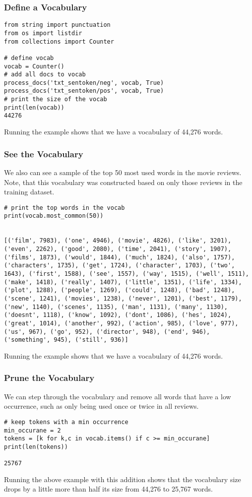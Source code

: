 \begin{frame}[fragile]\frametitle{Define a Vocabulary}
\begin{lstlisting}
from string import punctuation
from os import listdir
from collections import Counter

# define vocab
vocab = Counter()
# add all docs to vocab
process_docs('txt_sentoken/neg', vocab, True)
process_docs('txt_sentoken/pos', vocab, True)
# print the size of the vocab
print(len(vocab))
44276
\end{lstlisting}
Running the example shows that we have a vocabulary of 44,276 words.
\end{frame}

\begin{frame}[fragile]\frametitle{See the Vocabulary}
We also can see a sample of the top 50 most used words in the movie reviews.
Note, that this vocabulary was constructed based on only those reviews in the training dataset.

\begin{lstlisting}
# print the top words in the vocab
print(vocab.most_common(50))


[('film', 7983), ('one', 4946), ('movie', 4826), ('like', 3201), ('even', 2262), ('good', 2080), ('time', 2041), ('story', 1907), ('films', 1873), ('would', 1844), ('much', 1824), ('also', 1757), ('characters', 1735), ('get', 1724), ('character', 1703), ('two', 1643), ('first', 1588), ('see', 1557), ('way', 1515), ('well', 1511), ('make', 1418), ('really', 1407), ('little', 1351), ('life', 1334), ('plot', 1288), ('people', 1269), ('could', 1248), ('bad', 1248), ('scene', 1241), ('movies', 1238), ('never', 1201), ('best', 1179), ('new', 1140), ('scenes', 1135), ('man', 1131), ('many', 1130), ('doesnt', 1118), ('know', 1092), ('dont', 1086), ('hes', 1024), ('great', 1014), ('another', 992), ('action', 985), ('love', 977), ('us', 967), ('go', 952), ('director', 948), ('end', 946), ('something', 945), ('still', 936)]
\end{lstlisting}
Running the example shows that we have a vocabulary of 44,276 words.
\end{frame}

\begin{frame}[fragile]\frametitle{Prune the Vocabulary}
We can step through the vocabulary and remove all words that have a low occurrence, such as only being used once or twice in all reviews.

\begin{lstlisting}
# keep tokens with a min occurrence
min_occurane = 2
tokens = [k for k,c in vocab.items() if c >= min_occurane]
print(len(tokens))

25767
\end{lstlisting}
Running the above example with this addition shows that the vocabulary size drops by a little more than half its size from 44,276 to 25,767 words.
\end{frame}

